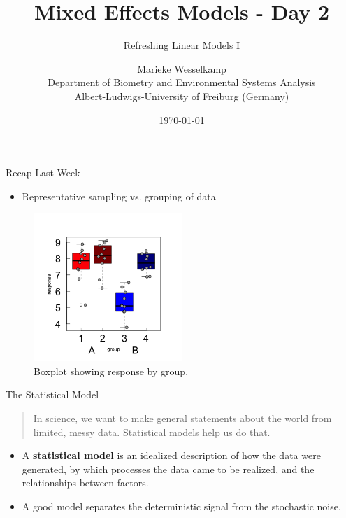 \documentclass{beamer}
\title{Mixed Effects Models - Day 2}
\subtitle{Refreshing Linear Models I}
\author{Marieke Wesselkamp \\ Department of Biometry and Environmental Systems Analysis \\ Albert-Ludwigs-University of Freiburg (Germany)}
\date{\today}
\begin{document}
\begin{frame}
  \titlepage
\end{frame}

\begin{frame}{Recap Last Week}
  \begin{itemize}
    \item Representative sampling vs. grouping of data
  \end{itemize}
  
  \begin{figure}[h]
    \centering
    \includegraphics[width=0.5\textwidth]{lectures/day_2_LM_refresh_I/figures/unnamed-chunk-3-1.png}
    \caption{Boxplot showing response by group.}
  \end{figure}
\end{frame}

\begin{frame}{The Statistical Model}
  \begin{quote}
    In science, we want to make general statements about the world from limited, messy data. Statistical models help us do that.
  \end{quote}
  
  \begin{itemize}
    \item A \textbf{statistical model} is an idealized description of how the data were generated, by which processes the data came to be realized, and the relationships between factors.
    \item A good model separates the deterministic signal from the stochastic noise.
  \end{itemize}
\end{frame}
\end{document}
